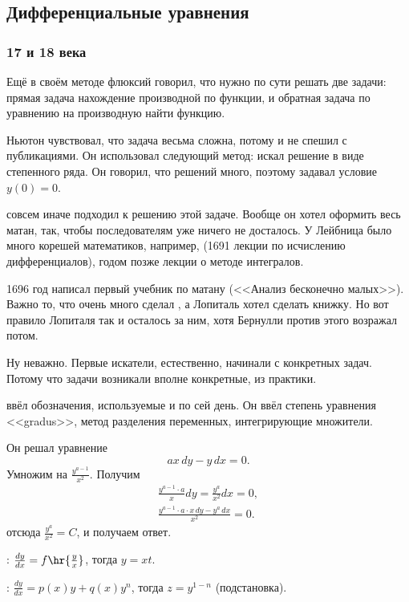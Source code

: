 \documentclass[a4paper,oneside,fleqn,10pt]{article}
\newcommand{\dx}{\,dx}
\newcommand{\dy}{\,dy}
\begin{document}
\subsection{Дифференциальные уравнения}

\subsubsection{17 и 18 века}

Ещё  в своём методе флюксий говорил, что нужно по сути решать две задачи:
прямая задача нахождение производной по функции, и обратная задача по уравнению
на производную найти функцию.

Ньютон чувствовал, что задача весьма сложна, потому и не спешил с публикациями.
Он использовал следующий метод: искал решение в виде степенного ряда.
Он говорил, что решений много, поэтому задавал условие $y(0) = 0$.

 совсем иначе подходил к решению этой задаче. Вообще он хотел оформить весь
матан, так, чтобы последователям уже ничего не досталось. У Лейбница было много
корешей математиков, например,  (1691 лекции по исчислению дифференциалов),
годом позже лекции о методе интегралов.

1696 год  написал первый учебник по матану (<<Анализ бесконечно малых>>).
Важно то, что очень много сделал , а Лопиталь хотел сделать книжку.
Но вот правило Лопиталя так и осталось за ним, хотя Бернулли против этого возражал потом.

Ну неважно. Первые искатели, естественно, начинали с конкретных задач.
Потому что задачи  возникали вполне конкретные, из практики.

 ввёл обозначения, используемые и по сей день.
Он ввёл степень уравнения <<gradus>>, метод разделения переменных,
интегрирующие множители.

Он решал уравнение
$$ax\dy - y\dx = 0.$$
Умножим на $\frac{y^{a-1}}{x^2}$. Получим
\begin{gather*}
\frac{y^{a-1}\cdot a}{x}dy = \frac{y^a}{x^2} dx = 0,\\
\frac{y^{a-1}\cdot a \cdot x\dy - y^a\dx}{x^2} = 0.
\end{gather*}
отсюда $\frac{y^a}{x^2} = C$, и получаем ответ.

:
$\frac{dy}{dx} = f\hr{\frac yx}$, тогда $y = xt$.

: $\frac{dy}{dx} = p(x) y + q(x) y^n$, тогда $z = y^{1-n}$ (подстановка).
\end{document}
